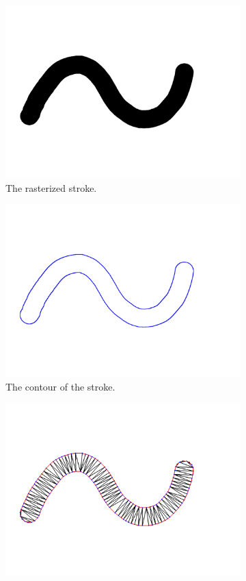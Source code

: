 \documentclass[review]{acmsiggraph}
\begin{document}
\begin{figure}
\centering
\begin{subfigure}[b]{0.3\textwidth}
  \centering
  \includegraphics[width=.9\textwidth]{images/stroke_triangulation/hardrendered}
  \caption{The rasterized stroke.}
  \label{fig:sub1}
\end{subfigure}%
\begin{subfigure}[b]{0.3\textwidth}
  \centering
  \includegraphics[width=.9\textwidth]{images/stroke_triangulation/hardpruned}
  \caption{The contour of the stroke.}
  \label{fig:sub2}
\end{subfigure}
\begin{subfigure}[b]{0.3\textwidth}
  \centering
  \includegraphics[width=.9\textwidth]{images/stroke_triangulation/hardmesh}

\end{subfigure}
\end{figure}
\end{document}
